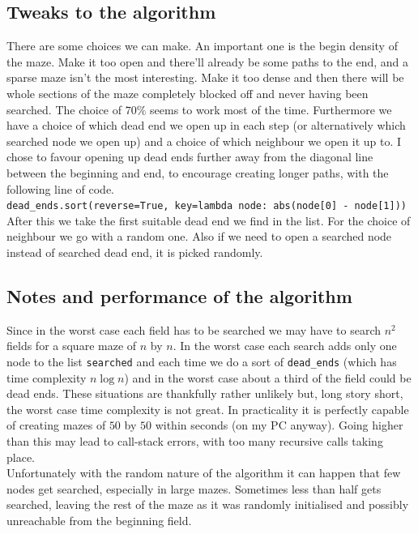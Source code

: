 \documentclass[10pt, a4paper, twoside]{amsart}
\newcommand{\1}{\mathbbm{1}}
\begin{document}
\subsection{Tweaks to the algorithm}
There are some choices we can make. An important one is the begin density of the maze. Make it too open and there'll already be some paths to the end, and a sparse maze isn't the most interesting. Make it too dense and then there will be whole sections of the maze completely blocked off and never having been searched. The choice of $70\%$ seems to work most of the time.
Furthermore we have a choice of which dead end we open up in each step (or alternatively which searched node we open up) and a choice of which neighbour we open it up to.
I chose to favour opening up dead ends further away from the diagonal line between the beginning and end, to encourage creating longer paths, with the following line of code.\\
\verb+dead_ends.sort(reverse=True, key=lambda node: abs(node[0] - node[1]))+\\
After this we take the first suitable dead end we find in the list. For the choice of neighbour we go with a random one. Also if we need to open a searched node instead of searched dead end, it is picked randomly.

\subsection{Notes and performance of the algorithm}
Since in the worst case each field has to be searched we may have to search $n^2$ fields for a square maze of $n$ by $n$. In the worst case each search adds only one node to the list \verb+searched+ and each time we do a sort of \verb+dead_ends+ (which has time complexity $n\log n$) and in the worst case about a third of the field could be dead ends. These situations are thankfully rather unlikely but, long story short, the worst case time complexity is not great. In practicality it is perfectly capable of creating mazes of $50$ by $50$ within seconds (on my PC anyway). Going higher than this may lead to call-stack errors, with too many recursive calls taking place.\\

Unfortunately with the random nature of the algorithm it can happen that few nodes get searched, especially in large mazes. Sometimes less than half gets searched, 
leaving the rest of the maze as it was randomly initialised and possibly unreachable from the beginning field.
\end{document}
